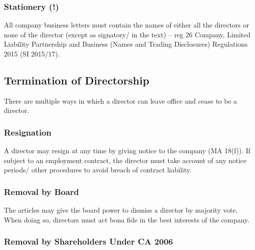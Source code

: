 \documentclass[
]{article}
\begin{document}
\hypertarget{stationery}{%
\subsubsection{Stationery (!)}\label{stationery}}

All company business letters must contain the names of either all the
directors or none of the director (except as signatory/ in the text) --
reg 26 Company, Limited Liability Partnership and Business (Names and
Trading Disclosures) Regulations 2015 (SI 2015/17).

\hypertarget{termination-of-directorship}{%
\subsection{Termination of
Directorship}\label{termination-of-directorship}}

There are multiple ways in which a director can leave office and cease
to be a director.

\hypertarget{resignation}{%
\subsubsection{Resignation}\label{resignation}}

A director may resign at any time by giving notice to the company (MA
18(f)). If subject to an employment contract, the director must take
account of any notice periods/ other procedures to avoid breach of
contract liability.

\hypertarget{removal-by-board}{%
\subsubsection{Removal by Board}\label{removal-by-board}}

The articles may give the board power to dismiss a director by majority
vote. When doing so, directors must act bona fide in the best interests
of the company.

\hypertarget{removal-by-shareholders-under-ca-2006}{%
\subsubsection{Removal by Shareholders Under CA
2006}\label{removal-by-shareholders-under-ca-2006}}
\end{document}
